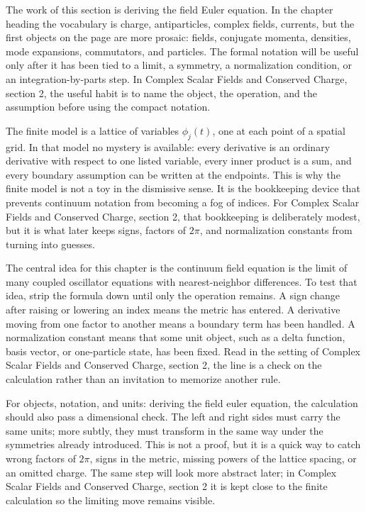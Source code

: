 The work of this section is deriving the field Euler equation.  In the chapter heading the vocabulary is charge, antiparticles, complex fields, currents, but the first objects on the page are more prosaic: fields, conjugate momenta, densities, mode expansions, commutators, and particles.  The formal notation will be useful only after it has been tied to a limit, a symmetry, a normalization condition, or an integration-by-parts step.  In Complex Scalar Fields and Conserved Charge, section 2, the useful habit is to name the object, the operation, and the assumption before using the compact notation.

The finite model is a lattice of variables \(\phi_j(t)\), one at each point of a spatial grid.  In that model no mystery is available: every derivative is an ordinary derivative with respect to one listed variable, every inner product is a sum, and every boundary assumption can be written at the endpoints.  This is why the finite model is not a toy in the dismissive sense.  It is the bookkeeping device that prevents continuum notation from becoming a fog of indices.  For Complex Scalar Fields and Conserved Charge, section 2, that bookkeeping is deliberately modest, but it is what later keeps signs, factors of \(2\pi\), and normalization constants from turning into guesses.

The central idea for this chapter is the continuum field equation is the limit of many coupled oscillator equations with nearest-neighbor differences.  To test that idea, strip the formula down until only the operation remains.  A sign change after raising or lowering an index means the metric has entered.  A derivative moving from one factor to another means a boundary term has been handled.  A normalization constant means that some unit object, such as a delta function, basis vector, or one-particle state, has been fixed.  Read in the setting of Complex Scalar Fields and Conserved Charge, section 2, the line is a check on the calculation rather than an invitation to memorize another rule.

For objects, notation, and units: deriving the field euler equation, the calculation should also pass a dimensional check.  The left and right sides must carry the same units; more subtly, they must transform in the same way under the symmetries already introduced.  This is not a proof, but it is a quick way to catch wrong factors of \(2\pi\), signs in the metric, missing powers of the lattice spacing, or an omitted charge.  The same step will look more abstract later; in Complex Scalar Fields and Conserved Charge, section 2 it is kept close to the finite calculation so the limiting move remains visible.

